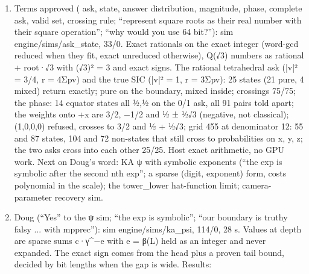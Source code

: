 \begin{enumerate}
\item Terms approved ( ask, state, answer distribution, magnitude, phase, complete ask, valid set, crossing rule; “represent square roots as their real number with their square operation”; “why would you use 64 bit?”): sim engine/sims/ask\_\allowbreak{}state, 33/0. Exact rationals on the exact integer (word-gcd reduced when they fit, exact unreduced otherwise), Q(√3) numbers as rational + root·√3 with (√3)² = 3 and exact signs. The rational tetrahedral ask (|v|² = 3/4, r = 4Σpv) and the true SIC (|v|² = 1, r = 3Σpv): 25 states (21 pure, 4 mixed) return exactly; pure on the boundary, mixed inside; crossings 75/75; the phase: 14 equator states all ½,½ on the 0/1 ask, all 91 pairs told apart; the weights onto +x are 3/2, −1/2 and ½ ± ½√3 (negative, not classical); (1,0,0,0) refused, crosses to 3/2 and ½ + ½√3; grid 455 at denominator 12: 55 and 87 states, 104 and 72 non-states that still cross to probabilities on x, y, z; the two asks cross into each other 25/25. Host exact arithmetic, no GPU work. Next on Doug's word: KA ψ with symbolic exponents (“the exp is symbolic after the second nth exp”; a sparse (digit, exponent) form, costs polynomial in the scale); the tower\_\allowbreak{}lower hat-function limit; camera-parameter recovery sim.
\item Doug (“Yes” to the ψ sim; “the exp is symbolic”; “our boundary is truthy falsy ... with mpprec”): sim engine/sims/ka\_\allowbreak{}psi, 114/0, 28 s. Values at depth are sparse sums c·γ\textasciicircum{}−e with e = β(L) held as an integer and never expanded. The exact sign comes from the head plus a proven tail bound, decided by bit lengths when the gap is wide. Results:


\end{enumerate}
